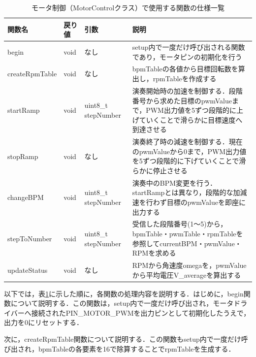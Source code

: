 \begin{table}[H]
    \caption{モータ制御（MotorControlクラス）で使用する関数の仕様一覧}
    \centering
    \label{table:kan_motor_func}
    \begin{tabular}{p{3.1cm}p{1.6cm}p{2.8cm}p{6.0cm}}
    \hline
    \textbf{関数名} & \textbf{戻り値} & \textbf{引数} & \textbf{説明}\\
    \hline
    begin & void & なし & setup内で一度だけ呼び出される関数であり，モータピンの初期化を行う\\
    \hline
    createRpmTable & void & なし & bpmTableの各値から目標回転数を算出し，rpmTableを作成する\\
    \hline
    startRamp & void & uint8\_t stepNumber & 演奏開始時の加速を制御する．段階番号から求めた目標のpwmValueまで，PWM出力値を5ずつ段階的に上げていくことで滑らかに目標速度へ到達させる\\
    \hline
    stopRamp & void & なし & 演奏終了時の減速を制御する．現在のpwmValueから0まで，PWM出力値を5ずつ段階的に下げていくことで滑らかに停止させる\\
    \hline
    changeBPM & void & uint8\_t stepNumber & 演奏中のBPM変更を行う．startRampとは異なり，段階的な加減速を行わず目標のpwmValueを即座に出力する\\
    \hline
    stepToNumber & void & uint8\_t stepNumber & 受信した段階番号(1〜5)から，bpmTable・pwmTable・rpmTableを参照してcurrentBPM・pwmValue・RPMを求める\\
    \hline
    updateStatus & void & なし & RPMから角速度omegaを，pwmValueから平均電圧V\_averageを算出する\\
    \hline
    \end{tabular}
\end{table}

以下では，表\ref{table:kan_motor_func}に示した順に，各関数の処理内容を説明する．はじめに，begin関数について説明する．この関数は，setup内で一度だけ呼び出され，モータドライバーへ接続されたPIN\_MOTOR\_PWMを出力ピンとして初期化したうえで，出力を0にリセットする．


次に，createRpmTable関数について説明する．この関数もsetup内で一度だけ呼び出され，bpmTableの各要素を16で除算することでrpmTableを生成する．

